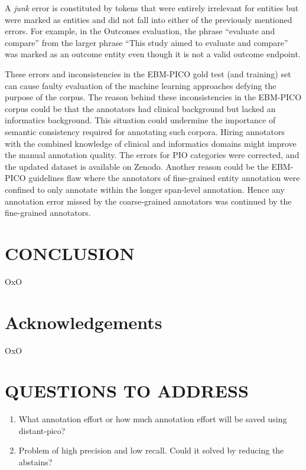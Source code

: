 \documentclass[10.7pt,]{article}
\begin{document}
A \textit{junk} error is constituted by tokens that were entirely irrelevant for entities but were marked as entities and did not fall into either of the previously mentioned errors.
For example, in the Outcomes evaluation, the phrase ``evaluate and compare'' from the larger phrase ``This study aimed to evaluate and compare'' was marked as an outcome entity even though it is not a valid outcome endpoint.


These errors and inconsistencies in the EBM-PICO gold test (and training) set can cause faulty evaluation of the machine learning approaches defying the purpose of the corpus.
The reason behind these inconsistencies in the EBM-PICO corpus could be that the annotators had clinical background but lacked an informatics background.
This situation could undermine the importance of semantic consistency required for annotating such corpora.
Hiring annotators with the combined knowledge of clinical and informatics domains might improve the manual annotation quality.
The errors for PIO categories were corrected, and the updated dataset is available on Zenodo.
Another reason could be the EBM-PICO guidelines flaw where the annotators of fine-grained entity annotation were confined to only annotate within the longer span-level annotation.
Hence any annotation error missed by the coarse-grained annotators was continued by the fine-grained annotators.
%
%
%
\section{CONCLUSION}\label{conclusion}
%
OxO
%
%
%
\section{Acknowledgements}\label{acknowledgements}
%
OxO
%
%
%
\section{QUESTIONS TO ADDRESS}\label{ques}
%
\begin{enumerate}
    \item What annotation effort or how much annotation effort will be saved using distant-pico?
    \item Problem of high precision and low recall. Could it solved by reducing the abstains?
\end{enumerate}
%
%
%


\end{document}

